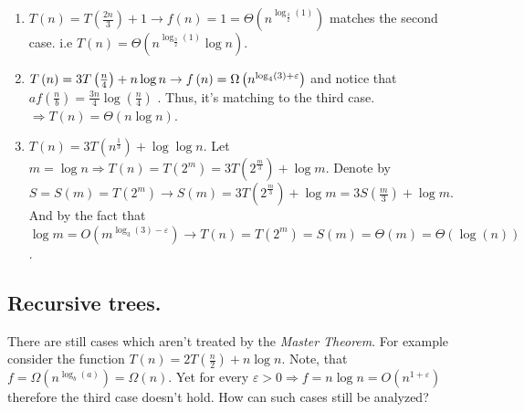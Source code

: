 \begin{example} 
\begin{enumerate}
    \item \( T\left(n\right) =  T\left(\frac{2n}{3}\right) + 1 \rightarrow f\left(n\right) = 1 =\Theta \left( n^{\log_{\frac{3}{2}} \left(1\right)}\right)\) matches the second case. i.e  \( T\left(n\right) = \Theta \left( n^{\log_{\frac{3}{2}} \left(1\right)}\log n \right)\).
    
    \item \( T\left(n\right) = 3 T\left(\frac{n}{4}\right) + n\log n \rightarrow f\left(n\right) = \Omega\left( n^{\log_{4}\left(3\right) + \varepsilon}  \right) \) and notice that \( af\left( \frac{n}{b}\right) = \frac{3n}{4}\log\left(\frac{n}{4}\right)\) . Thus, it's matching to the third case. \(\Rightarrow T\left(n\right) = \Theta\left(n\log n\right)\).
    
    \item \(T\left(n\right) = 3T\left( n^{\frac{1}{3}}\right) + \log\log n\). Let \( m = \log n \Rightarrow T\left( n\right) = T \left(2^m \right) = 3T\left(2^{\frac{m}{3}} \right) + \log m\).  Denote by \(S = S\left(m\right) = T\left(2^m\right) \rightarrow S\left(m\right) = 3T\left(2^{\frac{m}{3}} \right) + \log m = 3S\left(\frac{m}{3} \right) + \log m\). And by the fact that \(\log m = O\left(m^{\log_{3}\left(3\right)-\varepsilon} \right) \rightarrow T\left(n\right) = T\left(2^m\right) = S\left(m\right) = \Theta\left(m\right) = \Theta\left( \log(n)\right) \).  
\end{enumerate}
\end{example}

\subsection{Recursive trees.}
There are still cases which aren't treated by the \textit{Master Theorem}. For example consider the function \(T\left(n\right) = 2T\left(\frac{n}{2}\right) + n\log n \). Note, that \(f = \Omega\left( n^{\log_{b}(a)} \right) = \Omega\left(n\right)\). Yet for every \( \varepsilon > 0 \Rightarrow f = n\log n = O\left( n^{1+\varepsilon} \right) \) therefore the third case  doesn't hold. How can such cases still be analyzed? 

